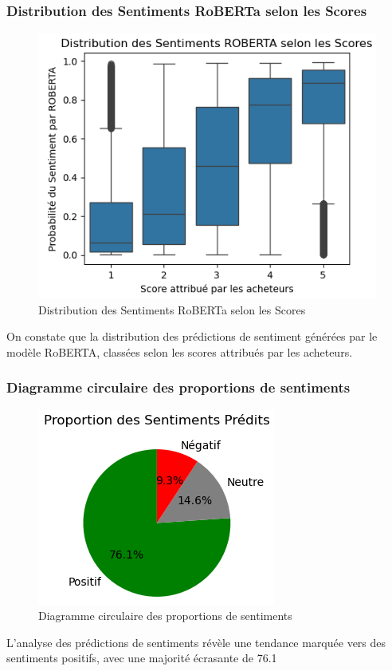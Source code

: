 \begin{frame}
    \frametitle{Distribution des Sentiments RoBERTa selon les Scores}
    \begin{figure}
        \includegraphics[scale=0.5]{Figures/sentimentrobertasurscore.PNG}
        \caption{Distribution des Sentiments RoBERTa selon les Scores}
    \end{figure}
    On constate que la distribution des prédictions de sentiment générées par le modèle RoBERTA, classées selon les scores attribués par les acheteurs.
\end{frame}

\begin{frame}
    \frametitle{Diagramme circulaire des proportions de sentiments}
    \begin{figure}
        \includegraphics[scale=0.6]{Figures/proportiondessentimentspredits.PNG}
        \caption{Diagramme circulaire des proportions de sentiments}
    \end{figure}
    L'analyse des prédictions de sentiments révèle une tendance marquée vers des sentiments positifs, avec une majorité écrasante de 76.1%
\end{frame}

